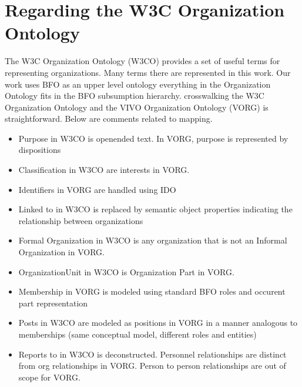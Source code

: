 \documentclass[letterpaper,10pt,english]{sphinxmanual}
\begin{document}
\section{Regarding the W3C Organization Ontology}
\label{\detokenize{notes-and-sources:regarding-the-w3c-organization-ontology}}
\sphinxAtStartPar
The W3C Organization Ontology (W3CO) provides a set of useful terms for representing
organizations.  Many terms there are represented in this work.  Our work
uses BFO as an upper level ontology \textendash{} everything in the Organization Ontology
fits in the BFO subsumption hierarchy.  cross\sphinxhyphen{}walking the W3C Organization
Ontology and the VIVO Organization Ontology (VORG) is straightforward.  Below are
comments related to mapping.
\begin{itemize}
\item {} 
\sphinxAtStartPar
Purpose in W3CO is open\sphinxhyphen{}ended text.  In VORG, purpose is represented by dispositions

\item {} 
\sphinxAtStartPar
Classification in W3CO are interests in VORG.

\item {} 
\sphinxAtStartPar
Identifiers in VORG are handled using IDO

\item {} 
\sphinxAtStartPar
Linked to in W3CO is replaced by semantic object properties indicating the
relationship between
organizations

\item {} 
\sphinxAtStartPar
Formal Organization in W3CO is any organization that is not an Informal Organization
in VORG.

\item {} 
\sphinxAtStartPar
OrganizationUnit in W3CO is Organization Part in VORG.

\item {} 
\sphinxAtStartPar
Membership in VORG is modeled using standard BFO roles and occurent part representation

\item {} 
\sphinxAtStartPar
Posts in W3CO are modeled as positions in VORG in a manner analogous to memberships
(same conceptual model, different roles and entities)

\item {} 
\sphinxAtStartPar
Reports to in W3CO is deconstructed.  Personnel relationships are distinct from org
relationships in VORG.  Person to person relationships are out of scope for VORG.


\end{itemize}
\end{document}
